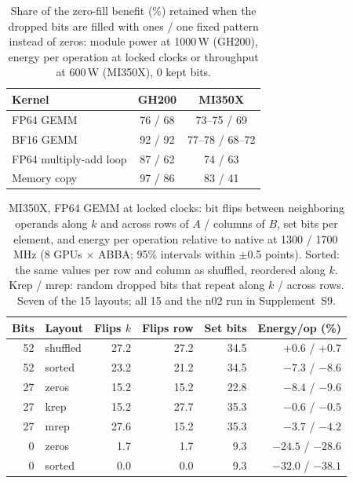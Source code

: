 \documentclass[conference]{IEEEtran}
\newcommand{\W}{\,W}
\newcommand{\pct}{\%}
\begin{document}
\begin{table}[t]
\caption{Share of the zero-fill benefit (\%) retained when the dropped bits are filled with ones / one fixed pattern
instead of zeros: module power at 1000\W{} (GH200), energy per operation at locked clocks or throughput at 600\W{}
(MI350X), 0 kept bits.}\label{tab:fillmain}
\centering\footnotesize\setlength{\tabcolsep}{4pt}
\begin{tabular}{@{}lcc@{}}
\toprule
Kernel & GH200 & MI350X \\
\midrule
FP64 GEMM & 76 / 68 & 73--75 / 69 \\
BF16 GEMM & 92 / 92 & 77--78 / 68--72 \\
FP64 multiply-add loop & 87 / 62 & 74 / 63 \\
Memory copy & 97 / 86 & 83 / 41 \\
\bottomrule
\end{tabular}
\end{table}

\begin{table}[t]
\caption{MI350X, FP64 GEMM at locked clocks: bit flips between neighboring operands along $k$ and across rows of $A$ /
columns of $B$, set bits per element, and energy per operation relative to native at 1300 / 1700\,MHz (8 GPUs
$\times$ ABBA; 95\pct{} intervals within $\pm$0.5 points). Sorted: the same values per row and column as shuffled,
reordered along $k$. Krep / mrep: random dropped bits that repeat along $k$ / across rows. Seven of the 15 layouts;
all 15 and the n02 run in Supplement~S9.}\label{tab:flips}
\centering\footnotesize\setlength{\tabcolsep}{3.5pt}
\begin{tabular}{@{}rlrrrr@{}}
\toprule
Bits & Layout & Flips $k$ & Flips row & Set bits & Energy/op (\%) \\
\midrule
52 & shuffled & 27.2 & 27.2 & 34.5 & $+0.6$ / $+0.7$ \\
52 & sorted & 23.2 & 21.2 & 34.5 & $-7.3$ / $-8.6$ \\
27 & zeros & 15.2 & 15.2 & 22.8 & $-8.4$ / $-9.6$ \\
27 & krep & 15.2 & 27.7 & 35.3 & $-0.6$ / $-0.5$ \\
27 & mrep & 27.6 & 15.2 & 35.3 & $-3.7$ / $-4.2$ \\
0 & zeros & 1.7 & 1.7 & 9.3 & $-24.5$ / $-28.6$ \\
0 & sorted & 0.0 & 0.0 & 9.3 & $-32.0$ / $-38.1$ \\
\bottomrule
\end{tabular}
\end{table}
\end{document}
